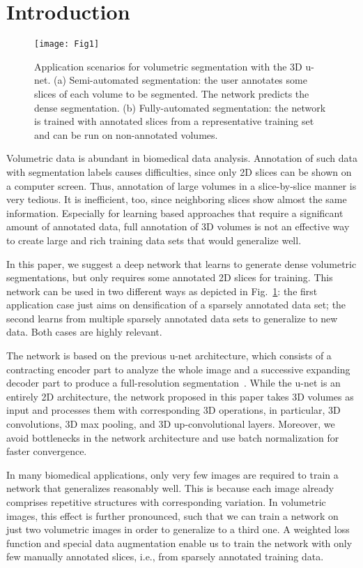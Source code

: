 \documentclass[runningheads,a4paper]{llncs}
\begin{document}
\section{Introduction}

\begin{figure}

\texttt{[image: Fig1]}
\caption{Application scenarios for volumetric segmentation with the 3D u-net. (a) Semi-automated segmentation: the user annotates some slices of each volume to be segmented. The network predicts the dense segmentation. (b) Fully-automated segmentation: the network is trained with annotated slices from a representative training set and can be run on non-annotated volumes.}
\label{fig:scenario}
\end{figure}

Volumetric data is abundant in biomedical data analysis. Annotation of such data with segmentation labels causes difficulties, since only 2D slices can be shown on a computer screen. Thus, annotation of large volumes in a slice-by-slice manner is very tedious. It is inefficient, too, since neighboring slices show almost the same information. Especially for learning based approaches that require a significant amount of annotated data, full annotation of 3D volumes is not an effective way to create large and rich training data sets that would generalize well. 

In this paper, we suggest a deep network that learns to generate dense volumetric segmentations, but only requires some annotated 2D slices for training. This network can be used in two different ways as depicted in Fig.~\ref{fig:scenario}: the first application case just aims on densification of a sparsely annotated data set; the second learns from multiple sparsely annotated data sets to generalize to new data. Both cases are highly relevant. 

The network is based on the previous u-net architecture, which consists of a contracting encoder part to analyze the whole image and a successive expanding decoder part to produce a full-resolution segmentation~\cite{unet}. While the u-net is an entirely 2D architecture, the network proposed in this paper takes 3D volumes as input and processes them with corresponding 3D operations, in particular, 3D convolutions, 3D max pooling, and 3D up-convolutional layers. 
Moreover, we avoid bottlenecks in the network architecture \cite{google} and use batch normalization \cite{bn} for faster convergence.

In many biomedical applications, only very few images are required to train a network that generalizes reasonably well. This is because each image already comprises repetitive structures with corresponding variation. In volumetric images, this effect is further pronounced, such that we can train a network on just two volumetric images in order to generalize to a third one. A weighted loss function and special data augmentation enable us to train the network with only few manually annotated slices, i.e., from sparsely annotated training data.  
\end{document}
